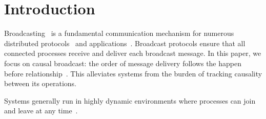 
\section{Introduction}


Broadcasting~\cite{hadzilacos1994modular} is a fundamental communication
mechanism for numerous distributed
protocols~\cite{nakamoto2009bitcoin,shapiro2011comprehensive} and
applications~\cite{nedelec2016crate}.  
Broadcast protocols ensure that all connected processes receive and deliver each
broadcast message.
In this paper, we focus on causal broadcast: the order of message delivery
follows the happen before
relationship~\cite{lamport1978time,schwarz1994detecting}. This alleviates
systems from the burden of tracking causality between its operations.

Systems generally run in highly dynamic environments where processes can join
and leave at any time~\cite{mostefaoui2005static}. 



